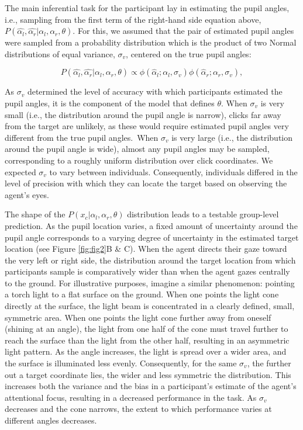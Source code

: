 \documentclass[
  man,mask,floatsintext]{apa7}
\begin{document}
The main inferential task for the participant lay in estimating the pupil angles, i.e., sampling from the first term of the right-hand side equation above, \(P(\hat{\alpha_l}, \hat{\alpha_r} | \alpha_l, \alpha_r, \theta)\). For this, we assumed that the pair of estimated pupil angles were sampled from a probability distribution which is the product of two Normal distributions of equal variance, \(\sigma_v\), centered on the true pupil angles:

\begin{equation}
P(\hat{\alpha_l}, \hat{\alpha_r} | \alpha_l, \alpha_r, \theta) \propto \phi(\hat{\alpha}_l ; \alpha_l, \sigma_v)\phi(\hat{\alpha}_r ; \alpha_r, \sigma_v),
\end{equation}

As \(\sigma_v\) determined the level of accuracy with which participants estimated the pupil angles, it is the component of the model that defines \(\theta\). When \(\sigma_v\) is very small (i.e., the distribution around the pupil angle is narrow), clicks far away from the target are unlikely, as these would require estimated pupil angles very different from the true pupil angles.~When \(\sigma_v\) is very large (i.e., the distribution around the pupil angle is wide), almost any pupil angles may be sampled, corresponding to a roughly uniform distribution over click coordinates. We expected \(\sigma_v\) to vary between individuals. Consequently, individuals differed in the level of precision with which they can locate the target based on observing the agent's eyes.

The shape of the \(P(x_c | \alpha_l, \alpha_r, \theta)\) distribution leads to a testable group-level prediction. As the pupil location varies, a fixed amount of uncertainty around the pupil angle corresponds to a varying degree of uncertainty in the estimated target location (see Figure \ref{fig:fig2}B \& C). When the agent directs their gaze toward the very left or right side, the distribution around the target location from which participants sample is comparatively wider than when the agent gazes centrally to the ground. For illustrative purposes, imagine a similar phenomenon: pointing a torch light to a flat surface on the ground. When one points the light cone directly at the surface, the light beam is concentrated in a clearly defined, small, symmetric area. When one points the light cone further away from oneself (shining at an angle), the light from one half of the cone must travel further to reach the surface than the light from the other half, resulting in an asymmetric light pattern. As the angle increases, the light is spread over a wider area, and the surface is illuminated less evenly. Consequently, for the same \(\sigma_v\), the further out a target coordinate lies, the wider and less symmetric the distribution. This increases both the variance and the bias in a participant's estimate of the agent's attentional focus, resulting in a decreased performance in the task. As \(\sigma_v\) decreases and the cone narrows, the extent to which performance varies at different angles decreases.
\end{document}
